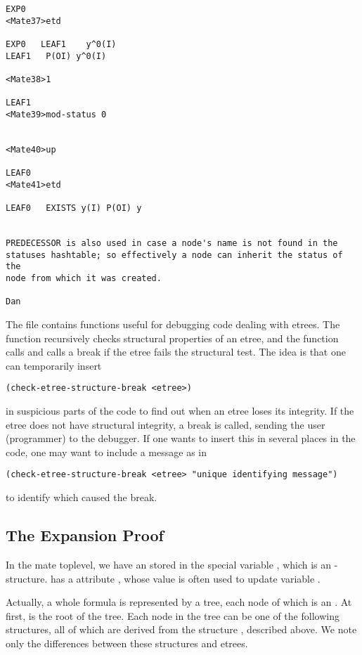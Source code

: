 \begin{verbatim}
EXP0
<Mate37>etd

EXP0   LEAF1    y^0(I)
LEAF1   P(OI) y^0(I)

<Mate38>1

LEAF1
<Mate39>mod-status 0


<Mate40>up

LEAF0
<Mate41>etd

LEAF0   EXISTS y(I) P(OI) y


PREDECESSOR is also used in case a node's name is not found in the
statuses hashtable; so effectively a node can inherit the status of the
node from which it was created.

Dan
\end{verbatim}

The file  contains functions useful for debugging
code dealing with etrees.  
The function 
recursively checks structural properties of an etree,
and the function 
calls  and calls a break
if the etree fails the structural test.
The idea is that one can temporarily insert 
\begin{verbatim}
(check-etree-structure-break <etree>) 
\end{verbatim}
in suspicious parts of the code
to find out when an etree loses its integrity.  If the etree does not
have structural integrity, a break is called, sending the user (programmer)
to the debugger.  If one wants to insert this in several places in the code,
one may want to include a message as in
\begin{verbatim}
(check-etree-structure-break <etree> "unique identifying message")
\end{verbatim}
to identify which caused the break.

\subsection{The Expansion Proof}
In the mate toplevel, we have an  stored in the 
special variable
, which is an -structure. 
has a attribute , whose value is often used to update
variable .

Actually, a whole formula is represented by a tree, each node of which is an 
.
At first,  is the root of the tree. 
Each node in the tree can be one of the following structures,
all of which are derived from the structure , described 
above. We note only the differences between these structures and etrees.

